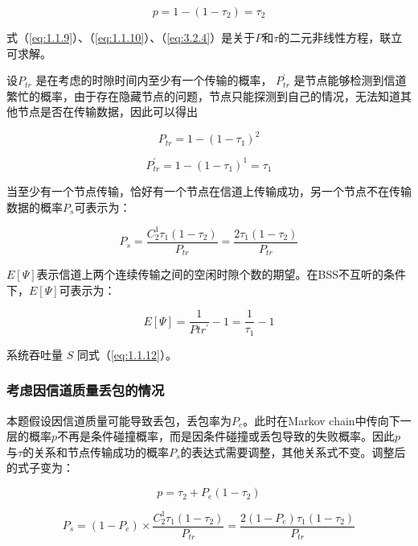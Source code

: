 \documentclass[bwprint]{gmcmthesis}
\begin{document}
\begin{equation}
p=1-(1-\tau_2 )=\tau_2
    \label{eq:3.2.4}
\end{equation}

式（\ref{eq:1.1.9}）、（\ref{eq:1.1.10}）、（\ref{eq:3.2.4}）是关于$P$和$\tau$的二元非线性方程，联立可求解。

设$P_{tr}$ 是在考虑的时隙时间内至少有一个传输的概率，
$P_{tr}^{'}$ 是节点能够检测到信道繁忙的概率，由于存在隐藏节点的问题，节点只能探测到自己的情况，无法知道其他节点是否在传输数据，因此可以得出

\begin{equation}
P_{tr}=1-(1-\tau_1 )^2
    \label{eq:3.2.5}
\end{equation}

\begin{equation}
P_{tr}^{'}=1-(1-\tau_1 )^1=\tau_1
    \label{eq:3.2.51}
\end{equation}

当至少有一个节点传输，恰好有一个节点在信道上传输成功，另一个节点不在传输数据的概率$P_s$可表示为：

\begin{equation}
P_s=\frac{C^1_2\tau_1(1-\tau_2)}{P_{tr}} 
=\frac{2\tau_1(1-\tau_2)}{P_{tr}}
    \label{eq:3.2.6}
\end{equation}

$E[\Psi ]$表示信道上两个连续传输之间的空闲时隙个数的期望。在BSS不互听的条件下，$E[\Psi ]$可表示为：

\begin{equation}
E[\Psi ]=\frac{1}{Ptr^{'}}-1  = \frac{1}{\tau_1 }-1 
    \label{eq:3.2.6}
\end{equation}

系统吞吐量 $S$ 同式（\ref{eq:1.1.12}）。

\subsubsection{考虑因信道质量丢包的情况}

本题假设因信道质量可能导致丢包，丢包率为$P_e$。此时在Markov chain中传向下一层的概率$p$不再是条件碰撞概率，而是因条件碰撞或丢包导致的失败概率。因此$p$与$\tau$的关系和节点传输成功的概率$P_s$的表达式需要调整，其他关系式不变。调整后的式子变为：

\begin{equation}
p=\tau_2+P_e(1-\tau_2)
    \label{eq:3.2.8}
\end{equation}

\begin{equation}
P_s=(1-P_e) \times \frac{C^1_2\tau_1(1-\tau_2)}{P_{tr}} 
=\frac{2(1-P_e)\tau_1(1-\tau_2)}{P_{tr}}
    \label{eq:3.2.9}
\end{equation}
\end{document}
